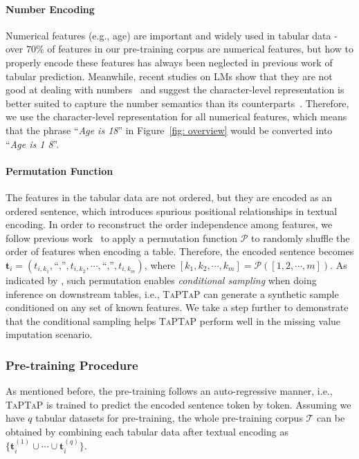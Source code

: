 \paragraph{Number Encoding} Numerical features (e.g., age) are important and widely used in tabular data - over $70$\% of features in our pre-training corpus are numerical features, but how to properly encode these features has always been neglected in previous work of tabular prediction. Meanwhile, recent studies on LMs show that they are not good at dealing with numbers~\citep{poet_paper} and suggest the character-level representation is better suited to capture the number semantics than its counterparts~\citep{DBLP:conf/emnlp/numeracy}. Therefore, we use the character-level representation for all numerical features, which means that the phrase ``\textit{Age is 18}'' in Figure~\ref{fig: overview} would be converted into ``\textit{Age is 1 8}''.

\paragraph{Permutation Function} The features in the tabular data are not ordered, but they are encoded as an ordered sentence, which introduces spurious positional relationships in textual encoding. In order to reconstruct the order independence among features, we follow previous work~\cite{GReaT} to apply a permutation function $\mathcal{P}$ to randomly shuffle the order of features when encoding a table. Therefore, the encoded sentence becomes $\mathbf{t}_i=(t_{i,k_1},\text{``,''},t_{i,k_2},\cdots,\text{``,''},t_{i,k_m})$, where $[k_1,k_2,\cdots,k_m]=\mathcal{P}([1,2,\cdots,m])$.
As indicated by \citet{GReaT}, such permutation enables \textit{conditional sampling} when doing inference on downstream tables, i.e., \textsc{TaPTaP} can generate a synthetic sample conditioned on any set of known features. We take a step further to demonstrate that the conditional sampling helps \textsc{TaPTaP} perform well in the missing value imputation scenario.

\subsubsection{Pre-training Procedure}

As mentioned before, the pre-training follows an auto-regressive manner, i.e., \textsc{TaPTaP} is trained to predict the encoded sentence token by token. Assuming we have $q$ tabular datasets for pre-training, the whole pre-training corpus $\mathcal{T}$ can be obtained by combining each tabular data after textual encoding as $\{\mathbf{t}_i^{(1)}\cup \cdots \cup \mathbf{t}_i^{(q)}\}$.

